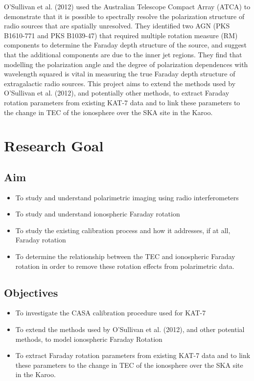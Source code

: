 \documentclass[a4paper,12pt,notitlepage]{article}
\begin{document}
O'Sullivan et al. (2012) used the Australian Telescope Compact Array (ATCA) to demonstrate that it is possible to spectrally resolve the polarization structure of radio sources that are spatially unresolved. They identified two AGN (PKS B1610-771 and PKS B1039-47) that required multiple rotation measure (RM) components to determine the Faraday depth structure of the source, and suggest that the additional components are due to the inner jet regions. They find that modelling the polarization angle and the degree of polarization dependences with wavelength squared is vital in measuring the true Faraday depth structure of extragalactic radio sources. This project aims to extend the methods used by O'Sullivan et al. (2012), and potentially other methods, to extract Faraday rotation parameters from existing KAT-7 data and to link these parameters to the change in TEC of the ionosphere over the SKA site in the Karoo.


\section{Research Goal}

\subsection{Aim}

\begin{itemize}
\item To study and understand polarimetric imaging using radio interferometers
\item To study and understand ionospheric Faraday rotation
\item To study the existing calibration process and how it addresses, if at all, Faraday rotation
\item To determine the relationship between the TEC and ionospheric Faraday rotation in order to remove these rotation effects from polarimetric data.
\end{itemize}

\subsection{Objectives}

\begin{itemize}
\item To investigate the CASA calibration procedure used for KAT-7
\item To extend the methods used by O'Sullivan et al. (2012), and other potential methods, to model ionospheric Faraday Rotation
\item To extract Faraday rotation parameters from existing KAT-7 data and to link these parameters to the change in TEC of the ionosphere over the SKA site in the Karoo. 
\end{itemize}
\end{document}
